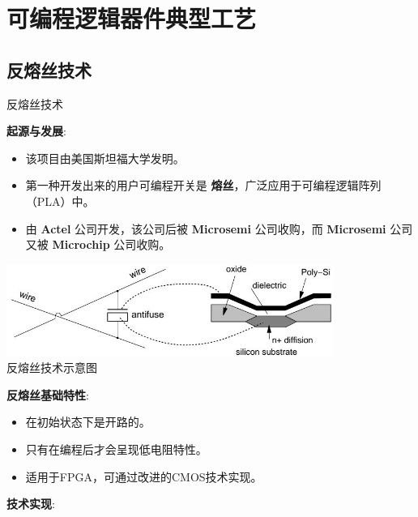 \section{可编程逻辑器件典型工艺}

\subsection{反熔丝技术}
\begin{frame}[allowframebreaks]{反熔丝技术}

\begin{block}{\textbf{起源与发展}:}
\begin{itemize}
\tightlist
\item
该项目由美国斯坦福大学发明。
\item
第一种开发出来的用户可编程开关是 \textbf{熔丝}，广泛应用于可编程逻辑阵列（PLA）中。
\item
由 \textbf{Actel} 公司开发，该公司后被 \textbf{Microsemi} 公司收购，而 \textbf{Microsemi} 公司又被 \textbf{Microchip} 公司收购。
\end{itemize}
\end{block}
\pagebreak
\begin{center}
    \includegraphics[width=0.8\textwidth, height=0.6\textheight, keepaspectratio]{img1/antifuse.jpeg}\\
    反熔丝技术示意图
\end{center}

\begin{block}{\textbf{反熔丝基础特性}:}
\begin{itemize}
\tightlist
\item
在初始状态下是开路的。
\item
只有在编程后才会呈现低电阻特性。
\item
适用于FPGA，可通过改进的CMOS技术实现。
\end{itemize}
\end{block}
\pagebreak
\begin{block}{\textbf{技术实现}:}
\end{block}
\end{frame}
